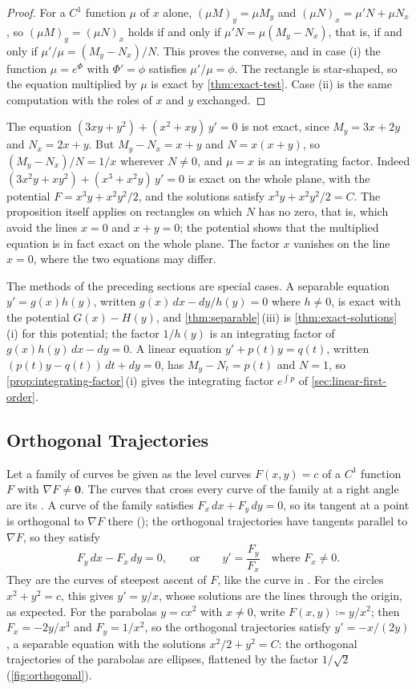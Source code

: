 \begin{proof}
For a $C^1$ function $\mu$ of $x$ alone, $(\mu M)_y=\mu M_y$ and $(\mu N)_x=\mu'N+\mu N_x$, so $(\mu M)_y=(\mu N)_x$ holds if and only if $\mu'N=\mu(M_y-N_x)$, that is, if and only if $\mu'/\mu=(M_y-N_x)/N$. This proves the converse, and in case (i) the function $\mu=e^\Phi$ with $\Phi'=\phi$ satisfies $\mu'/\mu=\phi$. The rectangle is star-shaped, so the equation multiplied by $\mu$ is exact by \cref{thm:exact-test}. Case (ii) is the same computation with the roles of $x$ and $y$ exchanged.
\end{proof}

The equation $(3xy+y^2)+(x^2+xy)\,y'=0$ is not exact, since $M_y=3x+2y$ and $N_x=2x+y$. But $M_y-N_x=x+y$ and $N=x(x+y)$, so $(M_y-N_x)/N=1/x$ wherever $N\ne0$, and $\mu=x$ is an integrating factor. Indeed $(3x^2y+xy^2)+(x^3+x^2y)\,y'=0$ is exact on the whole plane, with the potential $F=x^3y+x^2y^2/2$, and the solutions satisfy $x^3y+x^2y^2/2=C$. The proposition itself applies on rectangles on which $N$ has no zero, that is, which avoid the lines $x=0$ and $x+y=0$; the potential shows that the multiplied equation is in fact exact on the whole plane. The factor $x$ vanishes on the line $x=0$, where the two equations may differ.

The methods of the preceding sections are special cases. A separable equation $y'=g(x)h(y)$, written $g(x)\,dx-dy/h(y)=0$ where $h\ne0$, is exact with the potential $G(x)-H(y)$, and \cref{thm:separable}\,(iii) is \cref{thm:exact-solutions}\,(i) for this potential; the factor $1/h(y)$ is an integrating factor of $g(x)h(y)\,dx-dy=0$. A linear equation $y'+p(t)y=q(t)$, written $(p(t)y-q(t))\,dt+dy=0$, has $M_y-N_t=p(t)$ and $N=1$, so \cref{prop:integrating-factor}\,(i) gives the integrating factor $e^{\int p}$ of \cref{sec:linear-first-order}.

\subsection{Orthogonal Trajectories}

Let a family of curves be given as the level curves $F(x,y)=c$ of a $C^1$ function $F$ with $\nabla F\ne\mathbf 0$. The curves that cross every curve of the family at a right angle are its . A curve of the family satisfies $F_x\,dx+F_y\,dy=0$, so its tangent at a point is orthogonal to $\nabla F$ there (); the orthogonal trajectories have tangents parallel to $\nabla F$, so they satisfy
\[
F_y\,dx-F_x\,dy=0,\qquad\text{or}\qquad y'=\frac{F_y}{F_x}\quad\text{where }F_x\ne0 .
\]
They are the curves of steepest ascent of $F$, like the curve in . For the circles $x^2+y^2=c$, this gives $y'=y/x$, whose solutions are the lines through the origin, as expected. For the parabolas $y=cx^2$ with $x\ne0$, write $F(x,y)\coloneqq y/x^2$; then $F_x=-2y/x^3$ and $F_y=1/x^2$, so the orthogonal trajectories satisfy $y'=-x/(2y)$, a separable equation with the solutions $x^2/2+y^2=C$: the orthogonal trajectories of the parabolas are ellipses, flattened by the factor $1/\sqrt2$ (\cref{fig:orthogonal}).

